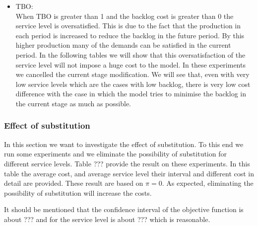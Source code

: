 \documentclass[10pt]{article}
\begin{document}
\begin{itemize}
    \item TBO:\\
    When TBO is greater than 1 and the backlog cost is greater than 0 the service level is oversatisfied. This is due to the fact that the production in each period is increased to reduce the backlog in the future period. By this higher production many of the demands can be satisfied in the current period. In the following tables we will show that this oversatisfaction of the service level will not impose a huge cost to the model. In these experiments we cancelled the current stage modification. We will see that, even with very low service levels which are the cases with low backlog, there is very low cost difference with the case in which the model tries to minimise the backlog in the current stage as much as possible.
\end{itemize}

\subsubsection{Effect of substitution}

In this section we want to investigate the effect of substitution. To this end we run some experiments and we eliminate the possibility of substitution for different service levels. Table ??? provide the result on these experiments. In this table the average cost, and average service level their interval and different cost in detail are provided. These result are based on $\pi =0$. As expected, eliminating the possibility of substitution will increase the costs. 

It should be mentioned that the confidence interval of the objective function is about ??? and for the service level is about ??? which is reasonable.
\end{document}
